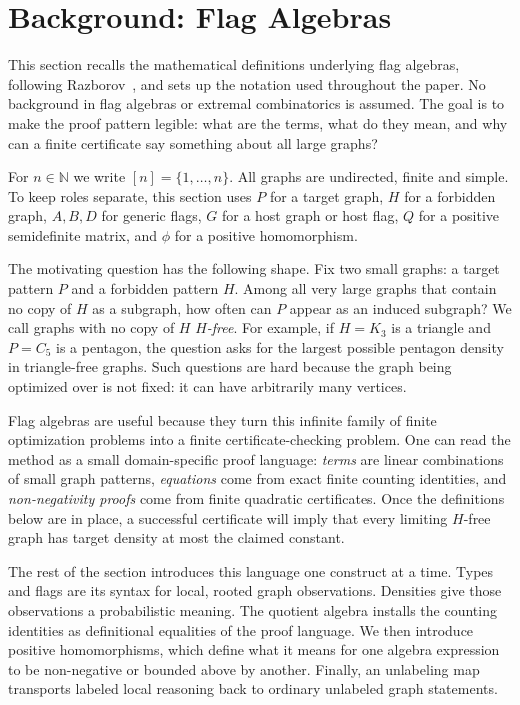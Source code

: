 \documentclass{article}
\begin{document}
\section{Background: Flag Algebras}
\label{sec:background}

This section recalls the mathematical definitions underlying flag algebras,
following Razborov~\cite{razborov2007flag}, and sets up the notation used
throughout the paper.  No background in flag algebras or extremal
combinatorics is assumed.  The goal is to make the proof pattern legible:
what are the terms, what do they mean, and why can a finite certificate say
something about all large graphs?

For $n \in \mathbb{N}$ we write $[n] = \{1,\ldots,n\}$.
All graphs are undirected, finite and simple.
To keep roles separate, this section uses $P$ for a target graph, $H$ for a
forbidden graph, $A,B,D$ for generic flags, $G$ for a host graph or host flag,
$Q$ for a positive semidefinite matrix, and $\phi$ for a positive
homomorphism.

The motivating question has the following shape.  Fix two small graphs:
a target pattern $P$ and a forbidden pattern $H$.  Among all very large graphs
that contain no copy of $H$ as a subgraph, how often can $P$ appear as an
induced subgraph?  We call graphs with no copy of $H$ \emph{$H$-free}.  For
example, if $H=K_3$ is a triangle and $P=C_5$ is a pentagon, the question asks
for the largest possible pentagon density in triangle-free graphs.  Such
questions are hard because the graph being optimized over is not fixed: it can
have arbitrarily many vertices.

Flag algebras are useful because they turn this infinite family of finite
optimization problems into a finite certificate-checking problem.  One can
read the method as a small domain-specific proof language:
\emph{terms} are linear combinations of small graph patterns,
\emph{equations} come from exact finite counting identities, and
\emph{non-negativity proofs} come from finite quadratic certificates.  Once
the definitions below are in place, a successful certificate will imply that
every limiting $H$-free graph has target density at most the claimed constant.

The rest of the section introduces this language one construct at a time.
Types and flags are its syntax for local, rooted graph observations.  Densities
give those observations a probabilistic meaning.  The quotient algebra installs
the counting identities as definitional equalities of the proof language.
We then introduce positive homomorphisms, which define what it means for one
algebra expression to be non-negative or bounded above by another.  Finally,
an unlabeling map transports labeled local reasoning back to ordinary
unlabeled graph statements.
\end{document}
